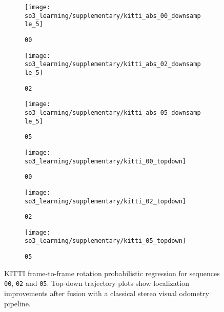\begin{figure*}[h!]
	\centering
	\begin{subfigure}[]{0.45\textwidth}
		\texttt{[image: so3\_learning/supplementary/kitti\_abs\_00\_downsample\_5]}
		\caption{\texttt{00}}
	\end{subfigure}
	\begin{subfigure}[]{0.45\textwidth} 
		\texttt{[image: so3\_learning/supplementary/kitti\_abs\_02\_downsample\_5]}
		\caption{\texttt{02}}
	\end{subfigure}
	\begin{subfigure}[]{0.45\textwidth} 
		\texttt{[image: so3\_learning/supplementary/kitti\_abs\_05\_downsample\_5]}
		\caption{\texttt{05}}
	\end{subfigure}
	\begin{subfigure}[]{0.45\textwidth} 
		\texttt{[image: so3\_learning/supplementary/kitti\_00\_topdown]}
		\caption{\texttt{00}}
	\end{subfigure}
	\begin{subfigure}[]{0.45\textwidth} 
		\texttt{[image: so3\_learning/supplementary/kitti\_02\_topdown]}
		\caption{\texttt{02}}
	\end{subfigure}
	\begin{subfigure}[]{0.45\textwidth} 
		\texttt{[image: so3\_learning/supplementary/kitti\_05\_topdown]}
		\caption{\texttt{05}}
	\end{subfigure}
	\caption{KITTI frame-to-frame rotation probabilistic regression for sequences \texttt{00}, \texttt{02} and \texttt{05}. Top-down trajectory plots show localization improvements after fusion with a classical stereo visual odometry pipeline.}
	\label{fig:hydranet_kitti_topdown}
\end{figure*}


